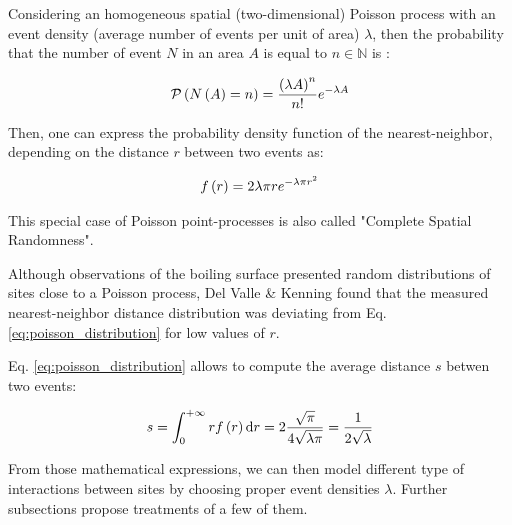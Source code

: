 \npar

Considering an homogeneous spatial (two-dimensional) Poisson process with an event density (\ie average number of events per unit of area) $\lambda$, then the probability that the number of event $N$ in an area $A$ is equal to $n \in \mathbb{N}$ is \cite{daley_introduction_2003}:

\begin{equation}
\mathcal{P}\left( N\left( A \right)=n \right)=\frac{\left( \lambda A \right)^{n}}{n!}e^{-\lambda A}
\label{eq:poisson_proba}
\end{equation}

Then, one can express the probability density function of the nearest-neighbor, depending on the distance $r$ between two events as:

\begin{align}
f\left( r \right)=2\lambda \pi r e^{-\lambda \pi r^{2}}
\label{eq:poisson_distribution}
\end{align} 


This special case of Poisson point-processes is also called "Complete Spatial Randomness".


\begin{remark*}{}
Although observations of the boiling surface presented random distributions of sites close to a Poisson process, Del Valle \& Kenning \cite{del_valle_subcooled_1985} found that the measured nearest-neighbor distance distribution was deviating from Eq. \ref{eq:poisson_distribution} for low values of $r$.
\end{remark*}

Eq. \ref{eq:poisson_distribution} allows to compute the average distance $s$ betwen two events:

\begin{equation}
s = \int_{0}^{+\infty} r f\left( r \right)\mathrm{d}r  = 2 \frac{\sqrt{\pi}}{4\sqrt{\lambda \pi}} = \frac{1}{2\sqrt{\lambda}}
\end{equation}


\npar

From those mathematical expressions, we can then model different type of interactions between sites by choosing proper event densities $\lambda$. Further subsections propose treatments of a few of them.


%
%
%
%
%
%

